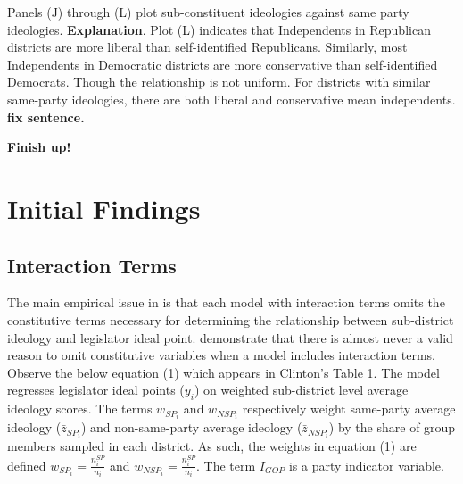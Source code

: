 \documentclass[10pt,letterpaper]{article}
\begin{document}
Panels (J) through (L) plot sub-constituent ideologies against same party ideologies. \textbf{Explanation}. Plot (L) indicates that Independents in Republican districts are more liberal than self-identified Republicans. Similarly, most Independents in Democratic districts are more conservative than self-identified Democrats. Though the relationship is not uniform. For districts with similar same-party ideologies, there are both liberal and conservative mean independents. \textbf{fix sentence.}

\textbf{Finish up!}


\newpage
 
\newpage

\section{Initial Findings} 

\subsection{Interaction Terms}
The main empirical issue in \citep{Clinton2006} is that each model with interaction terms omits the constitutive terms necessary for determining the relationship between sub-district ideology and legislator ideal point. \cite{Brambor2006} demonstrate that there is almost never a valid reason to omit constitutive variables when a model includes interaction terms. Observe the below equation (1) which appears in Clinton's Table 1. The model regresses legislator ideal points ($y_i$) on weighted sub-district level average ideology scores. The terms $w_{SP_i}$ and $w_{NSP_i}$ respectively weight same-party average ideology ($\bar{z}_{SP_i}$) and non-same-party average ideology ($\bar{z}_{NSP_i}$) by the share of group members sampled in each district. As such, the weights in equation (1) are defined $w_{SP_i} = \frac{n_i^{SP}}{n_i}$ and $w_{NSP_i} =  \frac{n_i^{SP}}{n_i}$. The term $I_{GOP}$ is a party indicator variable. 
\end{document}
